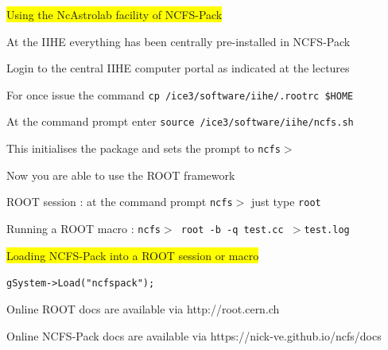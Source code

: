 \Tr
\onecolumn
\begin{center}
\colorbox{yellow}{Using the NcAstrolab facility of NCFS-Pack}
\end{center}
%
\begin{itemize}
\item At the {\blue IIHE} everything has been centrally pre-installed in {\blue NCFS-Pack}
\item[] Login to the central IIHE computer portal as indicated at the lectures
\item[] For once issue the command {\blue \tt cp /ice3/software/iihe/.rootrc \$HOME}
\item[] At the command prompt enter {\blue \tt source /ice3/software/iihe/ncfs.sh}
\item[] This initialises the package and sets the prompt to {\blue \tt ncfs$>$} 
{\red
\item[$\ast$] Now you are able to use the ROOT framework
}
\item[] ROOT session : at the command prompt {\blue \tt ncfs$>$} just type {\blue \tt root}
\item[] Running a ROOT macro : {\blue \tt ncfs$>$ root -b -q test.cc $>$test.log}
\item \colorbox{yellow}{Loading NCFS-Pack into a ROOT session or macro}
\item[] {\blue \tt gSystem->Load("ncfspack");}
\item Online ROOT docs are available via http://root.cern.ch
\item Online NCFS-Pack docs are available via https://nick-ve.github.io/ncfs/docs
\end{itemize}

